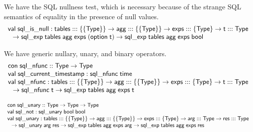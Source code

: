 \documentclass{article}
\newcommand{\mt}[1]{\mathsf{#1}}
\begin{document}
We have the SQL nullness test, which is necessary because of the strange SQL semantics of equality in the presence of null values.
$$\begin{array}{l}
  \mt{val} \; \mt{sql\_is\_null} : \mt{tables} ::: \{\{\mt{Type}\}\} \to \mt{agg} ::: \{\{\mt{Type}\}\} \to \mt{exps} ::: \{\mt{Type}\} \to \mt{t} ::: \mt{Type} \\
  \hspace{.1in} \to \mt{sql\_exp} \; \mt{tables} \; \mt{agg} \; \mt{exps} \; (\mt{option} \; \mt{t}) \to \mt{sql\_exp} \; \mt{tables} \; \mt{agg} \; \mt{exps} \; \mt{bool}
\end{array}$$

We have generic nullary, unary, and binary operators.
$$\begin{array}{l}
  \mt{con} \; \mt{sql\_nfunc} :: \mt{Type} \to \mt{Type} \\
  \mt{val} \; \mt{sql\_current\_timestamp} : \mt{sql\_nfunc} \; \mt{time} \\
  \mt{val} \; \mt{sql\_nfunc} : \mt{tables} ::: \{\{\mt{Type}\}\} \to \mt{agg} ::: \{\{\mt{Type}\}\} \to \mt{exps} ::: \{\mt{Type}\} \to \mt{t} ::: \mt{Type} \\
  \hspace{.1in} \to \mt{sql\_nfunc} \; \mt{t} \to \mt{sql\_exp} \; \mt{tables} \; \mt{agg} \; \mt{exps} \; \mt{t} \\\end{array}$$

$$\begin{array}{l}
  \mt{con} \; \mt{sql\_unary} :: \mt{Type} \to \mt{Type} \to \mt{Type} \\
  \mt{val} \; \mt{sql\_not} : \mt{sql\_unary} \; \mt{bool} \; \mt{bool} \\
  \mt{val} \; \mt{sql\_unary} : \mt{tables} ::: \{\{\mt{Type}\}\} \to \mt{agg} ::: \{\{\mt{Type}\}\} \to \mt{exps} ::: \{\mt{Type}\} \to \mt{arg} ::: \mt{Type} \to \mt{res} ::: \mt{Type} \\
  \hspace{.1in} \to \mt{sql\_unary} \; \mt{arg} \; \mt{res} \to \mt{sql\_exp} \; \mt{tables} \; \mt{agg} \; \mt{exps} \; \mt{arg} \to \mt{sql\_exp} \; \mt{tables} \; \mt{agg} \; \mt{exps} \; \mt{res} \\
\end{array}$$
\end{document}

